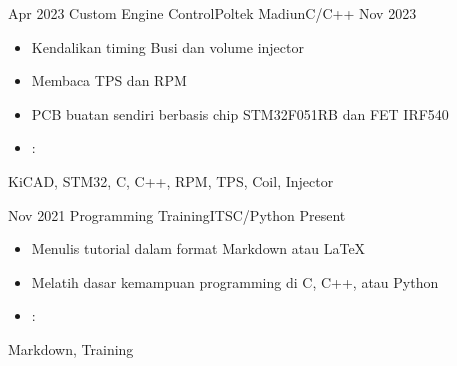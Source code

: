 \begin{experiences}
	\experience
	{Apr 2023} {Custom Engine Control}{Poltek Madiun}{C/C++}
	{Nov 2023}    {
		\begin{itemize}
			\item Kendalikan timing Busi dan volume injector
			\item Membaca TPS dan RPM
			\item PCB buatan sendiri berbasis chip STM32F051RB dan FET IRF540
			\item \faGithub: 
		\end{itemize}
	}
	{KiCAD, STM32, C, C++, RPM, TPS, Coil, Injector}
	\emptySeparator
	
	\experience
	{Nov 2021} {Programming Training}{ITS}{C/Python}
	{Present}    {
		\begin{itemize}
			\item Menulis tutorial dalam format Markdown atau \LaTeX
			\item Melatih dasar kemampuan programming di C, C++, atau Python
			\item \faGithub: 
		\end{itemize}
	}
	{Markdown, Training}
	\emptySeparator

\end{experiences}

